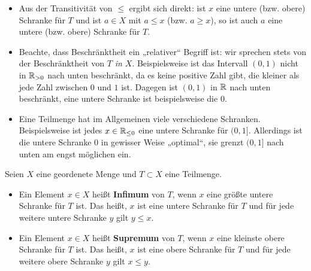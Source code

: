 \begin{bem} \quad
    \begin{itemize}
        \item Aus der Transitivität von $\le$ ergibt sich direkt: ist $x$ eine untere (bzw. obere) Schranke für $T$ und ist $a\in X$ mit $a\le x$ (bzw. $a\ge x$), so ist auch $a$ eine untere (bzw. obere) Schranke für $T$.
        \item Beachte, dass Beschränktheit ein „relativer“ Begriff ist: wir sprechen stets von der Beschränktheit von $T$ \emph{in $X$}. Beispielsweise ist das Intervall $(0,1)$ nicht in $\mathbb R_{>0}$ nach unten beschränkt, da es keine positive Zahl gibt, die kleiner als jede Zahl zwischen $0$ und $1$ ist. Dagegen ist $(0,1)$ in $\mathbb R$ nach unten beschränkt, eine untere Schranke ist beispielsweise die $0$.
        \item Eine Teilmenge hat im Allgemeinen viele verschiedene Schranken. Beispielsweise ist jedes $x\in \mathbb R_{\le 0}$ eine untere Schranke für $(0,1]$. Allerdings ist die untere Schranke $0$ in gewisser Weise „optimal“, sie grenzt $(0,1]$ nach unten am engst möglichen ein.
    \end{itemize}
\end{bem}


\begin{defin}  
    Seien $X$ eine geordenete Menge und $T\subset X$ eine Teilmenge.
    \begin{itemize}
        \item Ein Element $x\in X$ heißt \textbf{Infimum} von $T$, wenn $x$ eine größte untere Schranke für $T$ ist. Das heißt, $x$ ist eine untere Schranke für $T$ und für jede weitere untere Schranke $y$ gilt $y\le x$.
        \item Ein Element $x\in X$ heißt \textbf{Supremum} von $T$, wenn $x$ eine kleinste obere Schranke für $T$ ist. Das heißt, $x$ ist eine obere Schranke für $T$ und für jede weitere obere Schranke $y$ gilt $x\le y$.
    \end{itemize}
\end{defin}


